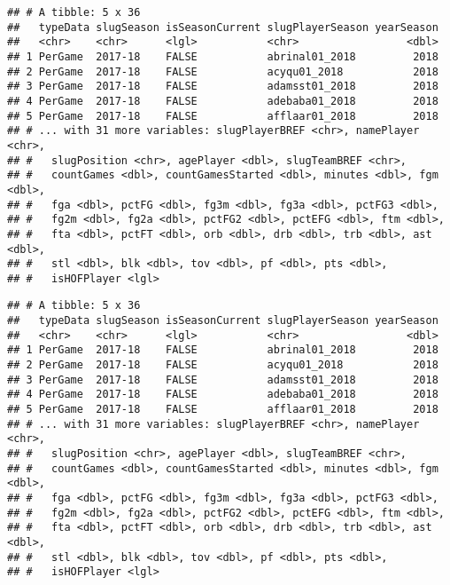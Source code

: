\documentclass[]{article}
\newenvironment{Shaded}{\begin{snugshade}}{\end{snugshade}}
\newcommand{\KeywordTok}[1]{\textcolor[rgb]{0.13,0.29,0.53}{\textbf{#1}}}
\newcommand{\DataTypeTok}[1]{\textcolor[rgb]{0.13,0.29,0.53}{#1}}
\newcommand{\DecValTok}[1]{\textcolor[rgb]{0.00,0.00,0.81}{#1}}
\newcommand{\StringTok}[1]{\textcolor[rgb]{0.31,0.60,0.02}{#1}}
\newcommand{\OperatorTok}[1]{\textcolor[rgb]{0.81,0.36,0.00}{\textbf{#1}}}
\newcommand{\NormalTok}[1]{#1}
\begin{document}
\begin{verbatim}
## # A tibble: 5 x 36
##   typeData slugSeason isSeasonCurrent slugPlayerSeason yearSeason
##   <chr>    <chr>      <lgl>           <chr>                 <dbl>
## 1 PerGame  2017-18    FALSE           abrinal01_2018         2018
## 2 PerGame  2017-18    FALSE           acyqu01_2018           2018
## 3 PerGame  2017-18    FALSE           adamsst01_2018         2018
## 4 PerGame  2017-18    FALSE           adebaba01_2018         2018
## 5 PerGame  2017-18    FALSE           afflaar01_2018         2018
## # ... with 31 more variables: slugPlayerBREF <chr>, namePlayer <chr>,
## #   slugPosition <chr>, agePlayer <dbl>, slugTeamBREF <chr>,
## #   countGames <dbl>, countGamesStarted <dbl>, minutes <dbl>, fgm <dbl>,
## #   fga <dbl>, pctFG <dbl>, fg3m <dbl>, fg3a <dbl>, pctFG3 <dbl>,
## #   fg2m <dbl>, fg2a <dbl>, pctFG2 <dbl>, pctEFG <dbl>, ftm <dbl>,
## #   fta <dbl>, pctFT <dbl>, orb <dbl>, drb <dbl>, trb <dbl>, ast <dbl>,
## #   stl <dbl>, blk <dbl>, tov <dbl>, pf <dbl>, pts <dbl>,
## #   isHOFPlayer <lgl>
\end{verbatim}

\begin{Shaded}
\end{Shaded}

\begin{verbatim}
## # A tibble: 5 x 36
##   typeData slugSeason isSeasonCurrent slugPlayerSeason yearSeason
##   <chr>    <chr>      <lgl>           <chr>                 <dbl>
## 1 PerGame  2017-18    FALSE           abrinal01_2018         2018
## 2 PerGame  2017-18    FALSE           acyqu01_2018           2018
## 3 PerGame  2017-18    FALSE           adamsst01_2018         2018
## 4 PerGame  2017-18    FALSE           adebaba01_2018         2018
## 5 PerGame  2017-18    FALSE           afflaar01_2018         2018
## # ... with 31 more variables: slugPlayerBREF <chr>, namePlayer <chr>,
## #   slugPosition <chr>, agePlayer <dbl>, slugTeamBREF <chr>,
## #   countGames <dbl>, countGamesStarted <dbl>, minutes <dbl>, fgm <dbl>,
## #   fga <dbl>, pctFG <dbl>, fg3m <dbl>, fg3a <dbl>, pctFG3 <dbl>,
## #   fg2m <dbl>, fg2a <dbl>, pctFG2 <dbl>, pctEFG <dbl>, ftm <dbl>,
## #   fta <dbl>, pctFT <dbl>, orb <dbl>, drb <dbl>, trb <dbl>, ast <dbl>,
## #   stl <dbl>, blk <dbl>, tov <dbl>, pf <dbl>, pts <dbl>,
## #   isHOFPlayer <lgl>
\end{verbatim}
\end{document}
